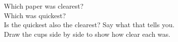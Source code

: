 \vspace{8pt}
Which paper was clearest? \wline[6cm]\\[10pt]
Which was quickest? \wline[6cm]\\[10pt]
Is the quickest also the clearest? Say what that tells you. \wline[4cm]\\[10pt]
Draw the cups side by side to show how clear each was.\par\medskip
{}
\clearpage
